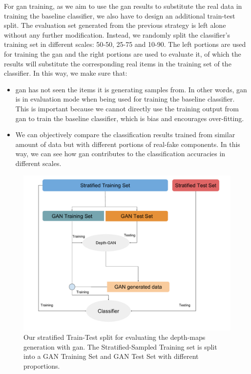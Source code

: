 For \acrshort{gan} training, as we aim to use the \acrshort{gan} results to substitute
the real data in training the baseline classifier, we also have to design an additional
train-test split. The evaluation set generated from the previous strategy is left alone
without any further modification. Instead, we randomly split the classifier's training set
in different scales: 50-50, 25-75 and 10-90. The left portions are used for training the
\acrshort{gan} and the right portions are used to evaluate it, of which the results will
substitute the corresponding real items in the training set of the classifier. In this
way, we make sure that:

\begin{itemize}
	\item \acrshort{gan} has not seen the items it is generating samples from. In
		other words, \acrshort{gan} is in evaluation mode when being used for training the
		baseline classifier. This is important because we cannot directly use the training output
		from \acrshort{gan} to train the baseline classifier, which is bias and encourages over-fitting.
	\item We can objectively compare the classification results trained from similar
		amount of data but with different portions of real-fake components. In this way,
		we can see how \acrshort{gan} contributes to the classification accuracies in
		different scales.
\end{itemize}


\begin{figure}[h]
	\centering
	\includegraphics[width=\linewidth]{img/gan_train_test_split_depth}
	\caption{Our stratified Train-Test split for evaluating the depth-maps generation with
		\acrshort{gan}. The Stratified-Sampled Training set is split into a GAN Training
		Set and GAN Test Set with different proportions.}
	\label{fig:gan_train_test_split_depth}
\end{figure}

